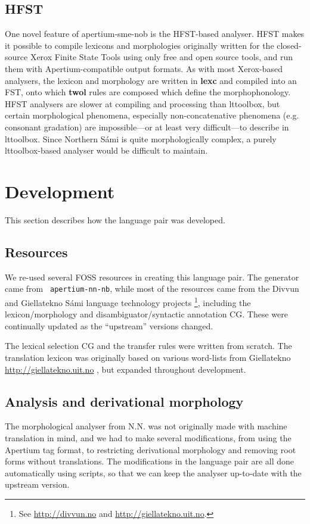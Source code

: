 \subsection{HFST}
\label{sec:hfst}
One novel feature of apertium-sme-nob is the HFST-based analyser. HFST
makes it possible to compile lexicons and morphologies originally
written for the closed-source Xerox Finite State Tools using only free
and open source tools, and run them with Apertium-compatible output
formats. As with most Xerox-based analysers, the \sme lexicon and
morphology are written in \textbf{lexc} and compiled into an FST, onto
which \textbf{twol} rules are composed which define the
morphophonology. HFST analysers are slower at compiling and processing
than lttoolbox, but certain morphological phenomena, especially
non-concatenative phenomena (e.g. \sme consonant gradation) are
impossible---or at least very difficult---to describe in lttoolbox.
Since Northern Sámi is quite morphologically complex, a purely
lttoolbox-based analyser would be difficult to maintain.


\section{Development}
  \label{sec:development}

This section describes how the language pair was developed.
\subsection{Resources}
We re-used several FOSS resources in creating this language pair. The
\nob{} generator came from {\tt
  apertium-nn-nb}\citep{unhammer2009rfr}, while most of the \sme{}
resources came from the Divvun and Giellatekno Sámi language
technology projects \footnote{See
  \href{http://divvun.no}{http://divvun.no} and
  \href{http://giellatekno.uit.no}{http://giellatekno.uit.no}.},
including the lexicon/morphology and disambiguator/syntactic
annotation CG. These were continually updated as the ``upstream''
versions changed.

The lexical selection CG and the transfer rules were written from
scratch. The translation lexicon was originally based on various
word-lists from Giellatekno
\href{http://giellatekno.uit.no}{http://giellatekno.uit.no}
, but expanded throughout
development.
\subsection{Analysis and derivational morphology}
The morphological analyser from N.N. was not
originally made with machine translation in mind, and we had to make
several modifications, from using the Apertium tag format, to
restricting derivational morphology and removing root forms without
translations. The modifications in the language pair are all done
automatically using scripts, so that we can keep the analyser
up-to-date with the upstream version.

